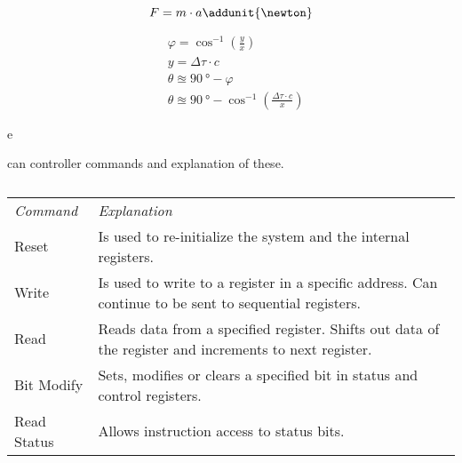 \begin{equation}
F = m \cdot a \addunit{\newton}
\end{equation}
\startexplain
\stopexplain

\begin{subequations} \label{eq:tech_ToA}
	\begin{flalign}
		&\varphi = \cos^{-1} \left( \frac{y}{x} \right) \\
		&y = \Delta \tau \cdot c \\
		&\theta \approxeq \SI{90}{\degree} - \varphi \\
		&\theta \approxeq \SI{90}{\degree} - \cos^{-1} \left( \frac{ \Delta\tau \cdot c}{x} \right)
	\end{flalign}
\end{subequations}



\gls{e}



\begin{table}[h]
	\centering
	\caption{\gls{can} controller commands and explanation of these.}
	
	\begin{tabularx}{\textwidth}{lX}
		\textit{Command}		&	\textit{Explanation} \\ \rowcolor{lightGrey} \toprule
		Reset					&	Is used to re-initialize the system and the internal registers.\\
		Write					&	Is used to write to a register in a specific address. Can continue to be sent to sequential registers.\\ \rowcolor{lightGrey}
		Read					&	Reads data from a specified register. Shifts out data of the register and increments to next register.\\
		Bit Modify				&	Sets, modifies or clears a specified bit in status and control registers.\\ \rowcolor{lightGrey}
		Read Status				&	Allows instruction access to status bits.\\
	\end{tabularx}
	\caption*{\citep{MCP2510}}
\end{table}\label{tab:mcp_cmd_expl}





